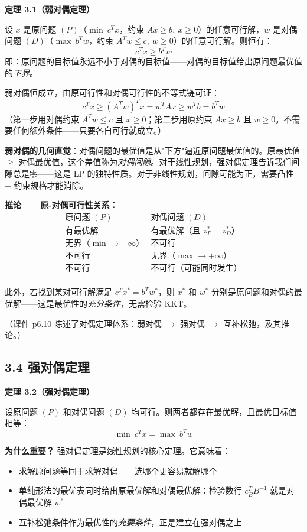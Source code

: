 \textbf{定理 3.1（弱对偶定理）}

设 $x$ 是原问题 $(P)$（$\min\ c^T x$，约束 $Ax\ge b,\ x\ge 0$）的任意可行解，$w$ 是对偶问题 $(D)$（$\max\ b^T w$，约束 $A^T w\le c,\ w\ge 0$）的任意可行解。则恒有：
\[
c^T x \ge b^T w
\]
即：原问题的目标值永远不小于对偶的目标值——对偶的目标值给出原问题最优值的\emph{下界}。

\medskip
弱对偶恒成立，由原可行性和对偶可行性的不等式链可证：
\[
c^T x \ge (A^T w)^T x = w^T A x \ge w^T b = b^T w
\]
（第一步用对偶约束 $A^T w \le c$ 且 $x\ge 0$；第二步用原约束 $Ax \ge b$ 且 $w\ge 0$。不需要任何额外条件——只要各自可行就成立。）

\medskip
\textbf{弱对偶的几何直觉}：对偶问题的最优值是从"下方"逼近原问题最优值的。原最优值 $\ge$ 对偶最优值，这个差值称为\emph{对偶间隙}。对于线性规划，强对偶定理告诉我们间隙总是零——这是 LP 的独特性质。对于非线性规划，间隙可能为正，需要凸性 + 约束规格才能消除。

\medskip
\textbf{推论——原-对偶可行性关系：}
\[
\begin{array}{c|c}
\text{原问题 }(P) & \text{对偶问题 }(D) \\
\hline
\text{有最优解} & \text{有最优解（且 } z_P^* = z_D^*\text{）} \\
\text{无界（}\min\to -\infty\text{）} & \text{不可行} \\
\text{不可行} & \text{无界（}\max\to +\infty\text{）} \\
\text{不可行} & \text{不可行（可能同时发生）} \\
\end{array}
\]

此外，若找到某对可行解满足 $c^T x^* = b^T w^*$，则 $x^*$ 和 $w^*$ 分别是原问题和对偶的最优解——这是最优性的\emph{充分条件}，无需检验 KKT。

（课件 p6.10 陈述了对偶定理体系：弱对偶 $\to$ 强对偶 $\to$ 互补松弛，及其推论。）

\subsection{3.4 强对偶定理}

\textbf{定理 3.2（强对偶定理）}

设原问题 $(P)$ 和对偶问题 $(D)$ 均可行。则两者都存在最优解，且最优目标值相等：
\[
\min\ c^T x = \max\ b^T w
\]

\medskip
\textbf{为什么重要？} 强对偶定理是线性规划的核心定理。它意味着：
\begin{itemize}
  \item 求解原问题等同于求解对偶——选哪个更容易就解哪个
  \item 单纯形法的最优表同时给出原最优解和对偶最优解：检验数行 $c_B^T B^{-1}$ 就是对偶最优解 $w^*$
  \item 互补松弛条件作为最优性的\emph{充要条件}，正是建立在强对偶之上
\end{itemize}

